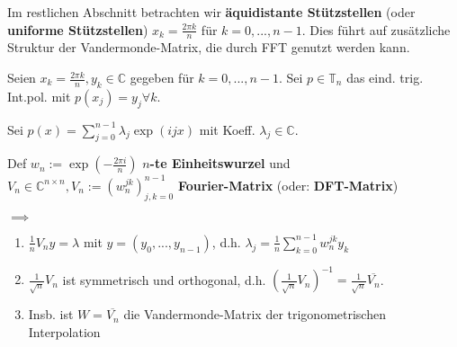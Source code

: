 Im restlichen Abschnitt betrachten wir \textbf{äquidistante Stützstellen} (oder \textbf{uniforme Stützstellen}) $x_k = \frac{2\pi k}{n}$ für $k=0, ..., n-1$. Dies führt auf zusätzliche Struktur der Vandermonde-Matrix, die durch FFT genutzt werden kann.

\begin{theorem}
	Seien $x_k = \frac{2\pi k}{n}, y_k \in \mathbb{C}$ gegeben für $k=0, ..., n-1$. Sei $p \in \mathbb{T}_n$ das eind. trig. Int.pol. mit $p(x_j) = y_j \forall k$.
	
	Sei $p(x) = \sum_{j=0}^{n-1} \lambda_j \exp(ijx)$ mit Koeff. $\lambda_j \in \mathbb{C}$.
	
	Def $w_n := \exp(- \frac{2\pi i}{n})$ \textbf{$n$-te Einheitswurzel} und $V_n \in \mathbb{C}^{n\times n}, V_n := (w_n^{jk})_{j,k=0}^{n-1}$ \textbf{Fourier-Matrix} (oder: \textbf{DFT-Matrix})
	
	$\implies$
	\begin{enumerate}
		\item $\frac{1}{n}V_n y = \lambda$ mit $y=(y_0, ..., y_{n-1})$, d.h. $\lambda_j = \frac{1}{n} \sum_{k=0}^{n-1} w_n^{jk} y_k$
		\item $\frac{1}{\sqrt{n}} V_n$ ist symmetrisch und orthogonal, d.h. $\left(\frac{1}{\sqrt{n}}V_n\right)^{-1} = \frac{1}{\sqrt{n}}\overline{V_n}$.
		\item Insb. ist $W=\overline{V_n}$ die Vandermonde-Matrix der trigonometrischen Interpolation
	\end{enumerate}
\end{theorem}

